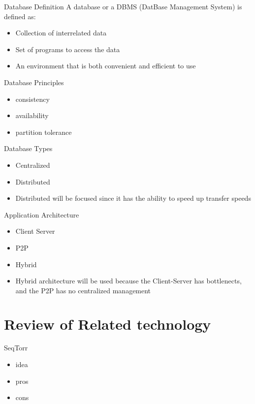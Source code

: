 \documentclass{beamer}
\begin{document}
\begin{frame}{Database Definition}
A database or a DBMS (DatBase Management System) \cite{Silberschatz2010} is defined as:
\begin{itemize}
    \item Collection of interrelated data
    \item Set of programs to access the data
    \item An environment that is both convenient and efficient to use
\end{itemize}
\end{frame}

\begin{frame}{Database Principles}

  \begin{itemize}   
    \item consistency
    \item availability
    \item partition tolerance
  \end{itemize}
\end{frame}

\begin{frame}{Database Types}
  \begin{itemize}   
    \item Centralized
    \item Distributed
    \item Distributed will be focused since it has the ability to speed up transfer speeds
  \end{itemize}
\end{frame}

\begin{frame}{Application Architecture}
  \begin{itemize}   
    \item Client Server
    \item P2P
    \item Hybrid
    \item Hybrid architecture will be used because the Client-Server has bottlenects, and the P2P has no centralized management
  \end{itemize}
\end{frame}

\section{Review of Related technology}

\begin{frame}{SeqTorr}
  \begin{itemize}   
    \item idea
    \item pros
    \item cons
  \end{itemize}
\end{frame}
\end{document}
